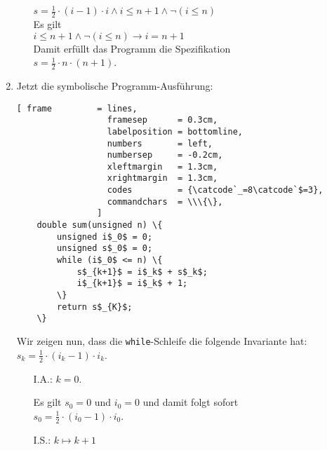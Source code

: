 \documentclass{article}
\renewcommand{\labelenumii}{\arabic{enumii}.}
\begin{document}
\begin{enumerate}
\begin{enumerate}
      \\[0.2cm]
      \hspace*{1.3cm}
      $s = \frac{1}{2} \cdot (i-1) \cdot i \wedge i \leq n + 1 \wedge \neg (i \leq n)$
      \\[0.2cm]
      Es gilt 
      \\
      \hspace*{1.3cm}
      $i \leq n + 1 \wedge \neg (i \leq n) \rightarrow i = n + 1$
      \\[0.2cm]
      Damit erf\"ullt das Programm die Spezifikation
      \\[0.2cm]
      \hspace*{1.3cm}
      $s = \frac{1}{2} \cdot n \cdot (n+1)$.
\end{enumerate}
\item Jetzt die symbolische Programm-Ausf\"uhrung:
      \begin{Verbatim}[ frame         = lines, 
                  framesep      = 0.3cm, 
                  labelposition = bottomline,
                  numbers       = left,
                  numbersep     = -0.2cm,
                  xleftmargin   = 1.3cm,
                  xrightmargin  = 1.3cm,
                  codes         = {\catcode`_=8\catcode`$=3},
                  commandchars  = \\\{\},
                ]
    double sum(unsigned n) \{
        unsigned i$_0$ = 0;
        unsigned s$_0$ = 0;
        while (i$_0$ <= n) \{
            s$_{k+1}$ = i$_k$ + s$_k$;
            i$_{k+1}$ = i$_k$ + 1;
        \}
        return s$_{K}$;
    \}
    \end{Verbatim} 
      Wir zeigen nun, dass die \texttt{while}-Schleife die folgende Invariante hat: 
      \\[0.2cm]
      \hspace*{1.3cm}
      $s_k = \frac{1}{2} \cdot (i_{k}-1) \cdot i_k$.
      \renewcommand{\labelenumii}{\arabic{enumii}.}
      \begin{enumerate}
      \item[I.A.:] $k=0$.

            Es gilt $s_0 = 0$ und $i_0 = 0$ und damit folgt sofort
            \\[0.2cm]
            \hspace*{1.3cm} $s_0 = \frac{1}{2} \cdot (i_{0}-1) \cdot i_0$.
      \item[I.S.:] $k \mapsto k+1$ 


\end{enumerate}
\end{enumerate}
\end{document}
